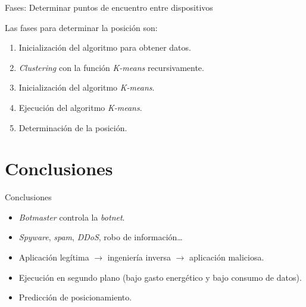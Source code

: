 \documentclass[aspectratio=43]{beamer}
\begin{document}
\begin{frame}{Fases: Determinar puntos de encuentro entre dispositivos}

Las fases para determinar la posición son:

\begin{enumerate}
\item Inicialización del algoritmo para obtener datos.
\item \emph{Clustering} con la función \emph{K-means} recursivamente.
\item Inicialización del algoritmo \emph{K-means}.
\item Ejecución del algoritmo \emph{K-means}.
\item Determinación de la posición.
\end{enumerate}

\end{frame}

\section{Conclusiones}

\begin{frame}{Conclusiones}

\begin{itemize}

\item \emph{Botmaster} controla la \emph{botnet}.
\item \emph{Spyware}, \emph{spam}, \emph{DDoS}, robo de información\ldots
\item Aplicación legítima $\rightarrow$ ingeniería inversa $\rightarrow$ aplicación maliciosa.
\item Ejecución en segundo plano (bajo gasto energético y bajo consumo de datos).
\item Predicción de posicionamiento.

\end{itemize}

\end{frame}



\maketitle
\end{document}
